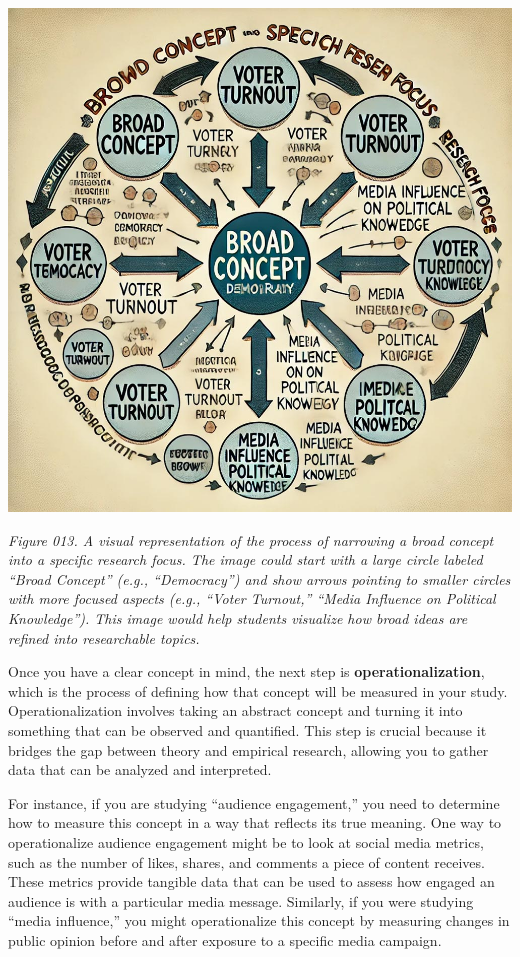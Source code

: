 \documentclass[
]{book}
\begin{document}
\includegraphics[width=1\linewidth,height=\textheight,keepaspectratio]{images/fig013.jpg}

\emph{Figure 013. A visual representation of the process of narrowing a broad concept into a specific research focus. The image could start with a large circle labeled ``Broad Concept'' (e.g., ``Democracy'') and show arrows pointing to smaller circles with more focused aspects (e.g., ``Voter Turnout,'' ``Media Influence on Political Knowledge''). This image would help students visualize how broad ideas are refined into researchable topics.}

Once you have a clear concept in mind, the next step is \textbf{operationalization}, which is the process of defining how that concept will be measured in your study. Operationalization involves taking an abstract concept and turning it into something that can be observed and quantified. This step is crucial because it bridges the gap between theory and empirical research, allowing you to gather data that can be analyzed and interpreted.

For instance, if you are studying ``audience engagement,'' you need to determine how to measure this concept in a way that reflects its true meaning. One way to operationalize audience engagement might be to look at social media metrics, such as the number of likes, shares, and comments a piece of content receives. These metrics provide tangible data that can be used to assess how engaged an audience is with a particular media message. Similarly, if you were studying ``media influence,'' you might operationalize this concept by measuring changes in public opinion before and after exposure to a specific media campaign.
\end{document}
